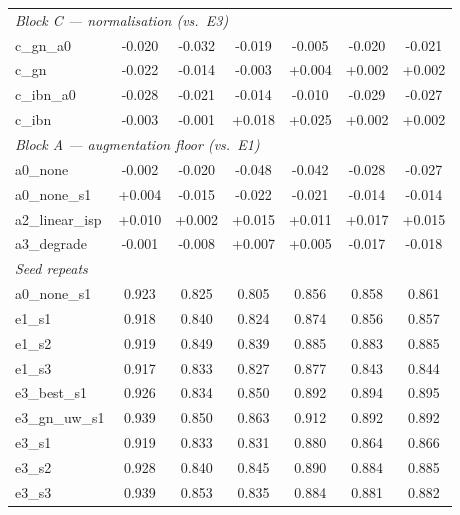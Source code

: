 \begin{table}[t]
\begin{tabular}{lcccccc}
\midrule
\multicolumn{7}{l}{\textit{Block C --- normalisation (vs.\ E3)}} \\
c\_gn\_a0 & -0.020 & -0.032 & -0.019 & -0.005 & -0.020 & -0.021 \\
c\_gn & -0.022 & -0.014 & -0.003 & +0.004 & +0.002 & +0.002 \\
c\_ibn\_a0 & -0.028 & -0.021 & -0.014 & -0.010 & -0.029 & -0.027 \\
c\_ibn & -0.003 & -0.001 & +0.018 & +0.025 & +0.002 & +0.002 \\
\midrule
\multicolumn{7}{l}{\textit{Block A --- augmentation floor (vs.\ E1)}} \\
a0\_none & -0.002 & -0.020 & -0.048 & -0.042 & -0.028 & -0.027 \\
a0\_none\_s1 & +0.004 & -0.015 & -0.022 & -0.021 & -0.014 & -0.014 \\
a2\_linear\_isp & +0.010 & +0.002 & +0.015 & +0.011 & +0.017 & +0.015 \\
a3\_degrade & -0.001 & -0.008 & +0.007 & +0.005 & -0.017 & -0.018 \\
\midrule
\multicolumn{7}{l}{\textit{Seed repeats}} \\
a0\_none\_s1 & 0.923 & 0.825 & 0.805 & 0.856 & 0.858 & 0.861 \\
e1\_s1 & 0.918 & 0.840 & 0.824 & 0.874 & 0.856 & 0.857 \\
e1\_s2 & 0.919 & 0.849 & 0.839 & 0.885 & 0.883 & 0.885 \\
e1\_s3 & 0.917 & 0.833 & 0.827 & 0.877 & 0.843 & 0.844 \\
e3\_best\_s1 & 0.926 & 0.834 & 0.850 & 0.892 & 0.894 & 0.895 \\
e3\_gn\_uw\_s1 & 0.939 & 0.850 & 0.863 & 0.912 & 0.892 & 0.892 \\
e3\_s1 & 0.919 & 0.833 & 0.831 & 0.880 & 0.864 & 0.866 \\
e3\_s2 & 0.928 & 0.840 & 0.845 & 0.890 & 0.884 & 0.885 \\
e3\_s3 & 0.939 & 0.853 & 0.835 & 0.884 & 0.881 & 0.882 \\
\bottomrule
\end{tabular}
\end{table}
